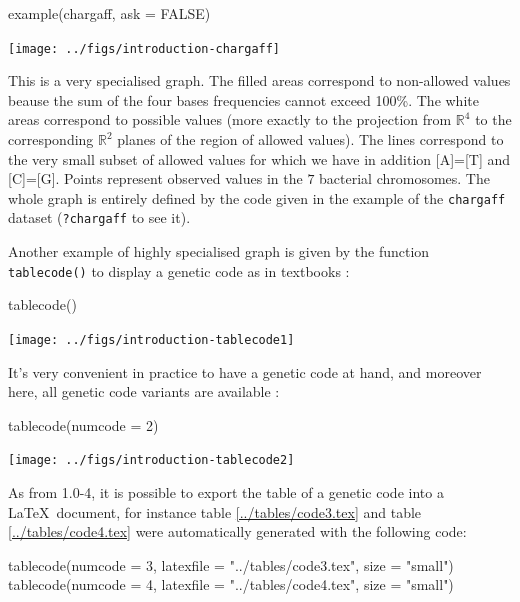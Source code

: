 \documentclass{article}
\begin{document}
\begin{Schunk}
\begin{Sinput}
 example(chargaff, ask = FALSE)
\end{Sinput}
\end{Schunk}
\texttt{[image: ../figs/introduction-chargaff]}

This is a very specialised graph. The filled areas correspond to non-allowed values beause the sum 
of the four bases frequencies cannot exceed 100\%. The white areas correspond to possible values 
(more exactly to the projection from $\mathbb{R}^4$ to the corresponding $\mathbb{R}^2$ 
planes of the region of allowed values). The lines correspond to the very small subset of allowed 
values for which we have in addition [A]=[T] and [C]=[G]. Points represent observed values in
the $7$ bacterial chromosomes. The whole graph is entirely defined by the code given in the
example of the \texttt{chargaff} dataset (\texttt{?chargaff} to see it).

Another example of highly specialised graph is given by the function \texttt{tablecode()} to
display a genetic code as in textbooks :

\begin{Schunk}
\begin{Sinput}
 tablecode()
\end{Sinput}
\end{Schunk}
\texttt{[image: ../figs/introduction-tablecode1]}

It's very convenient in practice to have a genetic code at hand, and moreover here,
all genetic code variants are available :

\begin{Schunk}
\begin{Sinput}
 tablecode(numcode = 2)
\end{Sinput}
\end{Schunk}
\texttt{[image: ../figs/introduction-tablecode2]}

As from \seqinr{} 1.0-4, it is possible to export the table of a genetic code into a \LaTeX~document,
for instance table \ref{../tables/code3.tex} and table \ref{../tables/code4.tex} were automatically generated with the following \Rlogo{} code:

\begin{Schunk}
\begin{Sinput}
 tablecode(numcode = 3, latexfile = "../tables/code3.tex", 
     size = "small")
 tablecode(numcode = 4, latexfile = "../tables/code4.tex", 
     size = "small")
\end{Sinput}
\end{Schunk}
\end{document}
